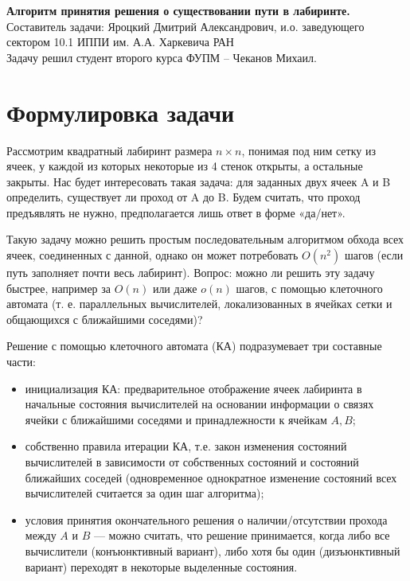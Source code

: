 \documentclass[12pt]{article}
\begin{document}
	\begin{center}
		\Large \textbf{Алгоритм принятия решения о существовании пути в лабиринте.\\}
		\normalsize 
		\bigskip
		Составитель задачи: Яроцкий Дмитрий Александрович, и.о. заведующего сектором 10.1 ИППИ им. А.А. Харкевича РАН\\
		Задачу решил студент второго курса ФУПМ -- Чеканов Михаил.\\
	\end{center}
\section*{Формулировка задачи}
	Рассмотрим квадратный лабиринт размера $n \times n$, понимая под ним сетку из ячеек, у каждой из которых некоторые из 4 стенок открыты, а остальные закрыты. Нас будет интересовать такая задача: для заданных двух ячеек A и B определить, существует ли проход от A до B. Будем считать, что проход предъявлять не нужно, предполагается лишь ответ в форме «да/нет».

Такую задачу можно решить простым последовательным алгоритмом обхода всех ячеек, соединенных с данной, однако он может потребовать $O(n^2)$ шагов (если путь заполняет почти весь лабиринт). Вопрос: можно ли решить эту задачу быстрее, например за $O(n)$ или даже $o(n)$ шагов, с помощью клеточного автомата (т. е. параллельных вычислителей, локализованных в ячейках сетки и общающихся с ближайшими соседями)?

Решение с помощью клеточного автомата (КА) подразумевает три составные части:

\begin{itemize}
\item инициализация КА: предварительное отображение ячеек лабиринта в начальные состояния вычислителей на основании информации о связях ячейки с ближайшими соседями и принадлежности к ячейкам $A, B$;
\item собственно правила итерации КА, т.е. закон изменения состояний вычислителей в зависимости от собственных состояний и состояний ближайших соседей (одновременное однократное изменение состояний всех вычислителей считается за один шаг алгоритма);
\item условия принятия окончательного решения о наличии/отсутствии прохода между $A$ и $B$ — можно считать, что решение принимается, когда либо все вычислители (конъюнктивный вариант), либо хотя бы один (дизъюнктивный вариант) переходят в некоторые выделенные состояния.
\end{itemize}
\end{document}
